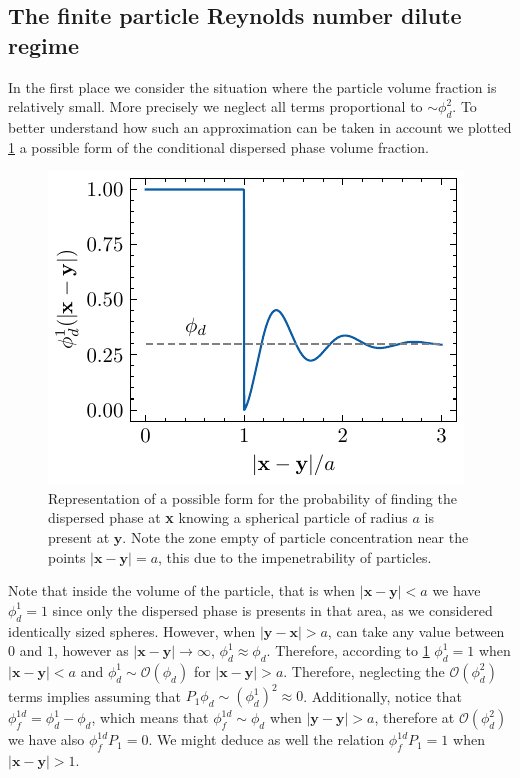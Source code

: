 \subsection{The finite particle Reynolds number dilute regime}
In the first place we consider the situation where the particle volume fraction is relatively small. 
More precisely we neglect all terms proportional to $\sim \phi_d^2$. 
To better understand how such an approximation can be taken in account we plotted \ref{fig:distrib} a possible form of the conditional dispersed phase volume fraction.
\begin{figure}[h!]
    \centering
    \includegraphics[width=0.2\textheight]{image/dist_phi.pdf}
    \caption{Representation of a possible form for the probability of finding the dispersed phase at \textbf{x} knowing a spherical particle of radius $a$ is present at $\textbf{y}$.
    Note the zone empty of particle concentration near the points $|\textbf{x}- \textbf{y}|=a$, this due to the impenetrability of particles. 
    }
    \label{fig:distrib}
\end{figure}
Note that inside the volume of the particle, that is when $|\textbf{x}-\textbf{y}| < a$ we have $\phi_d^1 = 1$ since only the dispersed phase is presents in that area, as we considered identically sized spheres. 
However, when $|\textbf{y} - \textbf{x}| >a$, can take any value between $0$ and $1$, however as $|\textbf{x}- \textbf{y}|\to\infty$, $\phi_d^1 \approx \phi_d$.
Therefore, according to \ref{fig:distrib} $\phi_d^1 = 1$ when $|\textbf{x}-\textbf{y}| < a$  and $\phi_d^1 \sim \mathcal{O}(\phi_d)$ for $|\textbf{x}-\textbf{y}| > a$. 
Therefore, neglecting the $\mathcal{O}(\phi_d^2)$ terms  implies assuming that $P_1 \phi_d \sim (\phi_d^1)^2 \approx 0$. 
Additionally, notice that $\phi_f^{1d} = \phi_d^1 - \phi_d$, which means that $\phi_f^{1d} \sim \phi_d$ when $|\textbf{y} -\textbf{y}| > a$, therefore at  $\mathcal{O}(\phi_d^2)$ we have also $\phi_f^{1d} P_1= 0$.
We might deduce as well the relation $\phi_f^{1d} P_1 = 1$ when $|\textbf{x}-\textbf{y}| >1$. 

